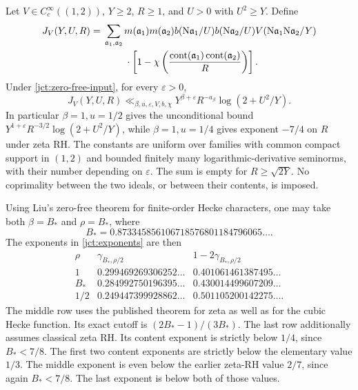 \begin{theorem}
\label{jct:tail-theorem}
Let \(V\in C_c^\infty((1,2))\), \(Y\ge2\), \(R\ge1\), and
\(U>0\) with \(U^2\ge Y\).  Define
\begin{equation}
\begin{split}
 J_V(Y,U,R)={}&\sum_{\mathfrak a_1,\mathfrak a_2}
 m(\mathfrak a_1)m(\mathfrak a_2)
 b(\mathrm N\mathfrak a_1/U)b(\mathrm N\mathfrak a_2/U)
 V(\mathrm N\mathfrak a_1\mathrm N\mathfrak a_2/Y)\\
 &\hspace{8mm}\cdot
 \left[1-\chi\left(
 \frac{\operatorname{cont}(\mathfrak a_1)\operatorname{cont}(\mathfrak a_2)}R\right)\right].
 \label{jct:tail}
\end{split}
\end{equation}
Under \eqref{jct:zero-free-input}, for every \(\varepsilon>0\),
\begin{equation}
 J_V(Y,U,R)\ll_{\beta,u,\varepsilon,V,b,\chi}
 Y^{\beta+\varepsilon}R^{-a_\beta}\log(2+U^2/Y).
 \label{jct:tail-general}
\end{equation}
In particular \(\beta=1,u=1/2\) gives the unconditional bound
\(Y^{1+\varepsilon}R^{-3/2}\log(2+U^2/Y)\), while
\(\beta=1,u=1/4\) gives exponent \(-7/4\) on \(R\) under zeta RH.
The constants are uniform over families with common compact support
in \((1,2)\) and bounded finitely many logarithmic-derivative
seminorms, with their number depending on \(\varepsilon\).
The sum is empty for \(R\ge\sqrt{2Y}\).
No coprimality between the two ideals, or between their contents,
is imposed.
\end{theorem}

\begin{theorem}
\label{jct:liu-specialization}
Using Liu's zero-free theorem for finite-order Hecke characters,
one may take both \(\beta=B_*\) and \(\rho=B_*\), where
\[
 B_*=0.873345856106718576801184796065\ldots.
\]
The exponents in \eqref{jct:exponents} are then
\[
\begin{array}{c|cc}
 \rho&\gamma_{B_*,\rho/2}&1-2\gamma_{B_*,\rho/2}\\\hline
 1&0.299469269306252\ldots&0.401061461387495\ldots\\
 B_*&0.284992750196395\ldots&0.430014499607209\ldots\\
 1/2&0.249447399928862\ldots&0.501105200142275\ldots.
\end{array}
\]
The middle row uses the published theorem for zeta as well as for
the cubic Hecke function. Its exact cutoff is
\((2B_*-1)/(3B_*)\). The last row additionally assumes classical
zeta RH. Its content
exponent is strictly below \(1/4\), since \(B_*<7/8\).
The first two content exponents are strictly below the elementary
value \(1/3\). The middle exponent is even below the earlier
zeta-RH value \(2/7\), since again \(B_*<7/8\).
The last exponent is below both of those values.
\end{theorem}

